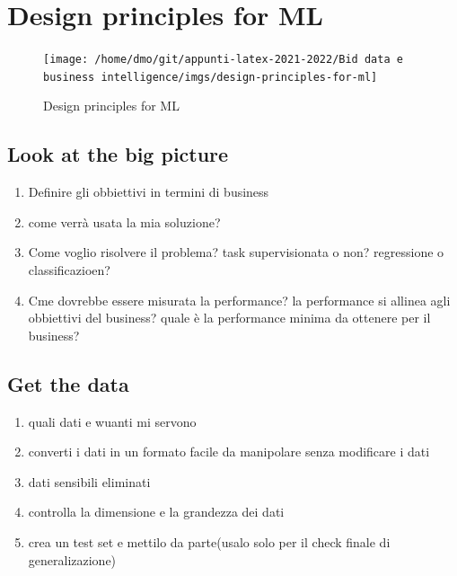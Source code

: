 \section{Design principles for ML}


\begin{figure}[H]
    \centering
    \texttt{[image: /home/dmo/git/appunti-latex-2021-2022/Bid data e business intelligence/imgs/design-principles-for-ml]}
    \caption{Design principles for ML}
    \label{fig:Design_principles}
\end{figure}

\subsection{Look at the big picture}
\begin{enumerate}
    \item Definire gli obbiettivi in termini di business
    \item come verrà usata la mia soluzione?
    \item Come voglio risolvere il problema? task supervisionata o non? regressione o classificazioen?
    \item Cme dovrebbe essere misurata la performance? la performance si allinea agli
    obbiettivi del business? quale è la performance minima da ottenere per il business?
\end{enumerate}


\subsection{Get the data}
\begin{enumerate}
    \item quali dati e wuanti mi servono
    \item converti i dati in un formato facile da manipolare senza modificare i dati
    \item dati sensibili eliminati
    \item controlla la dimensione e la grandezza dei dati
    \item crea un test set e mettilo da parte(usalo solo per il check finale di generalizazione)
\end{enumerate}


